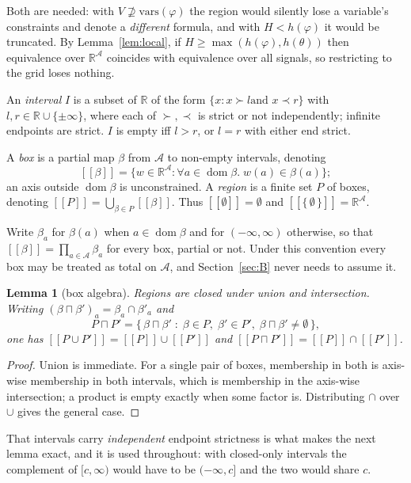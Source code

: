 \documentclass[11pt,a4paper]{article}
\theoremstyle{plain}
\newtheorem{lemma}[theorem]{Lemma}
\theoremstyle{definition}
\theoremstyle{remark}
\newcommand{\R}{\mathbb{R}}
\newcommand{\dom}{\operatorname{dom}}
\newcommand{\sem}[1]{[\![#1]\!]}
\newcommand{\Ax}{\mathcal{A}}
\begin{document}
Both are needed: with $V \not\supseteq \mathrm{vars}(\varphi)$ the region would
silently lose a variable's constraints and denote a \emph{different} formula,
and with $H < h(\varphi)$ it would be truncated. By Lemma~\ref{lem:local}, if
$H \ge \max(h(\varphi), h(\theta))$ then equivalence over $\R^{\Ax}$ coincides
with equivalence over all signals, so restricting to the grid loses nothing.

An \emph{interval} $I$ is a subset of $\R$ of the form $\{x : x \succ l \text{
and } x \prec r\}$ with $l, r \in \R \cup \{\pm\infty\}$, where each of
$\succ, \prec$ is strict or not independently; infinite endpoints are strict.
$I$ is empty iff $l > r$, or $l = r$ with either end strict.

A \emph{box} is a partial map $\beta$ from $\Ax$ to non-empty intervals,
denoting
\[
  \sem{\beta} = \{ w \in \R^{\Ax} : \forall a \in \dom\beta.\; w(a) \in \beta(a) \};
\]
an axis outside $\dom\beta$ is unconstrained. A \emph{region} is a finite set
$P$ of boxes, denoting $\sem{P} = \bigcup_{\beta \in P} \sem{\beta}$. Thus
$\sem{\emptyset} = \emptyset$ and $\sem{\{\,\emptyset\,\}} = \R^{\Ax}$.

Write $\beta_a$ for $\beta(a)$ when $a \in \dom\beta$ and for $(-\infty,\infty)$
otherwise, so that $\sem{\beta} = \prod_{a \in \Ax} \beta_a$ for every box,
partial or not. Under this convention every box may be treated as total on $\Ax$,
and Section~\ref{sec:B} never needs to assume it.

\begin{lemma}[box algebra]\label{lem:algebra}
Regions are closed under union and intersection. Writing
$(\beta \sqcap \beta')_a = \beta_a \cap \beta'_a$ and
\[
  P \sqcap P' = \{\, \beta \sqcap \beta' \;:\; \beta \in P,\; \beta' \in P',\;
  \beta \sqcap \beta' \neq \emptyset \,\},
\]
one has $\sem{P \cup P'} = \sem{P} \cup \sem{P'}$ and
$\sem{P \sqcap P'} = \sem{P} \cap \sem{P'}$.
\end{lemma}

\begin{proof}
Union is immediate. For a single pair of boxes, membership in both is axis-wise
membership in both intervals, which is membership in the axis-wise intersection;
a product is empty exactly when some factor is. Distributing $\cap$ over $\cup$
gives the general case.
\end{proof}

That intervals carry \emph{independent} endpoint strictness is what makes the
next lemma exact, and it is used throughout: with closed-only intervals the
complement of $[c,\infty)$ would have to be $(-\infty,c]$ and the two would
share $c$.
\end{document}
